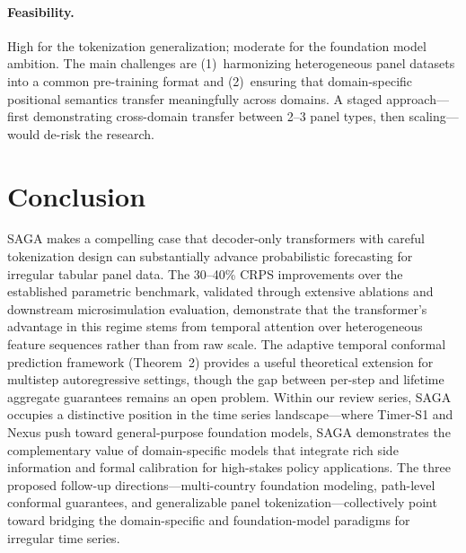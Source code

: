 \documentclass[11pt,a4paper]{article}
\begin{document}
\paragraph{Feasibility.}
High for the tokenization generalization; moderate for the foundation model ambition. The main challenges are (1)~harmonizing heterogeneous panel datasets into a common pre-training format and (2)~ensuring that domain-specific positional semantics transfer meaningfully across domains. A staged approach---first demonstrating cross-domain transfer between 2--3 panel types, then scaling---would de-risk the research.

\section*{Conclusion}

SAGA makes a compelling case that decoder-only transformers with careful tokenization design can substantially advance probabilistic forecasting for irregular tabular panel data. The 30--40\% CRPS improvements over the established parametric benchmark, validated through extensive ablations and downstream microsimulation evaluation, demonstrate that the transformer's advantage in this regime stems from temporal attention over heterogeneous feature sequences rather than from raw scale. The adaptive temporal conformal prediction framework (Theorem~2) provides a useful theoretical extension for multistep autoregressive settings, though the gap between per-step and lifetime aggregate guarantees remains an open problem. Within our review series, SAGA occupies a distinctive position in the time series landscape---where Timer-S1 and Nexus push toward general-purpose foundation models, SAGA demonstrates the complementary value of domain-specific models that integrate rich side information and formal calibration for high-stakes policy applications. The three proposed follow-up directions---multi-country foundation modeling, path-level conformal guarantees, and generalizable panel tokenization---collectively point toward bridging the domain-specific and foundation-model paradigms for irregular time series.
\end{document}
